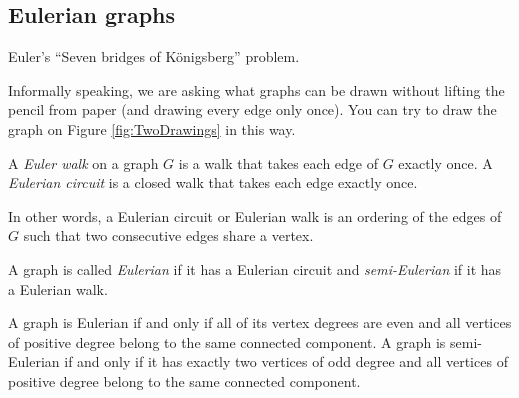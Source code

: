 \begin{page}

\subsection{Eulerian graphs}
Euler's ``Seven bridges of K\"onigsberg'' problem.

Informally speaking, we are asking what graphs can be drawn without lifting the pencil from paper
(and drawing every edge only once).
You can try to draw the graph on Figure \ref{fig:TwoDrawings} in this way.


\end{page}

\begin{page}

\begin{dfn}
A \emph{Euler walk} on a graph $G$ is a walk that takes each edge of $G$ exactly once.
A \emph{Eulerian circuit} is a closed walk that takes each edge exactly once.
\end{dfn}

\end{page}

\begin{page}

In other words, a Eulerian circuit or Eulerian walk is an ordering of the edges of $G$
such that two consecutive edges share a vertex.

A graph is called \emph{Eulerian} if it has a Eulerian circuit and \emph{semi-Eulerian} if it has a Eulerian walk.


\end{page}

\begin{page}

\begin{thm}
A graph is Eulerian if and only if all of its vertex degrees are even
and all vertices of positive degree belong to the same connected component.
A graph is semi-Eulerian if and only if it has exactly two vertices of odd degree
and all vertices of positive degree belong to the same connected component.
\end{thm}

\end{page}

